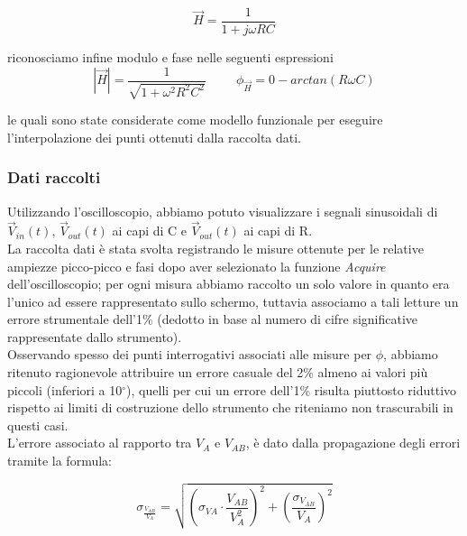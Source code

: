\documentclass{article}
\theoremstyle{definition}
\begin{document}
\[\vec{H} =  \frac{1}{1 + j \omega R C }\]

\noindent riconosciamo infine modulo e fase nelle seguenti espressioni
\[\left| \vec{H} \right| = \frac{1}{\sqrt{1 +  \omega^2 R^2 C^2}} \hspace{1cm} \phi_{\vec{H}} = 0 - arctan(R \omega C)\]

\noindent le quali sono state considerate come modello funzionale per eseguire l'interpolazione dei punti ottenuti dalla raccolta dati. 

\subsubsection*{Dati raccolti}
Utilizzando l'oscilloscopio, abbiamo potuto visualizzare i segnali sinusoidali di \(\vec{V}_{in}(t)\), \(\vec{V}_{out}(t)\) ai capi di C e \(\vec{V}_{out}(t)\) ai capi di R. \\
La raccolta dati è stata svolta registrando le misure ottenute per le relative ampiezze picco-picco e fasi dopo aver selezionato la funzione \textit{Acquire} dell'oscilloscopio; per ogni misura abbiamo raccolto un solo valore in quanto era l'unico ad essere rappresentato sullo schermo, tuttavia associamo a tali letture un errore strumentale dell'1\% (dedotto in base al numero di cifre significative rappresentate dallo strumento). \\
Osservando spesso dei punti interrogativi associati alle misure per \(\phi\), abbiamo ritenuto ragionevole attribuire un errore casuale del 2\% almeno ai valori più piccoli (inferiori a 10\(^{\circ}\)), quelli per cui un errore dell'1\% risulta piuttosto riduttivo rispetto ai limiti di costruzione dello strumento che riteniamo non trascurabili in questi casi. \\
L'errore associato al rapporto tra \(V_{A}\) e \(V_{AB}\), è dato dalla propagazione degli errori tramite la formula:

\[ \sigma_{\frac{V_{AB}}{V_{A}}} = \sqrt{ \left(\sigma_{VA} \cdot \frac{V_{AB}}{V_{A}^{2}}\right)^{2} + \left(\frac{\sigma_{V_{AB}}}{V_{A}}\right)^{2} }\]
\end{document}
